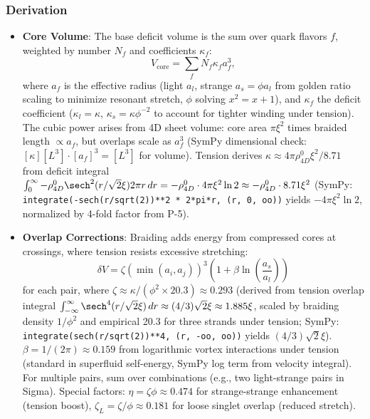 \subsubsection{Derivation}

\begin{itemize}
\item \textbf{Core Volume}: The base deficit volume is the sum over quark flavors $f$, weighted by number $N_f$ and coefficients $\kappa_f$:
  \[
  V_{\text{core}} = \sum_f N_f \kappa_f a_f^3,
  \]
  where $a_f$ is the effective radius (light $a_l$, strange $a_s = \phi a_l$ from golden ratio scaling to minimize resonant stretch, $\phi$ solving $x^2 = x + 1$), and $\kappa_f$ the deficit coefficient ($\kappa_l = \kappa$, $\kappa_s = \kappa \phi^{-2}$ to account for tighter winding under tension). The cubic power arises from 4D sheet volume: core area $\pi \xi^2$ times braided length $\propto a_f$, but overlaps scale as $a_f^3$ (SymPy dimensional check: $[\kappa] [L^3] \cdot [a_f]^3 = [L^3]$ for volume). Tension derives $\kappa \approx 4 \pi \rho_{4D}^0 \xi^2 / 8.71$ from deficit integral $\int_0^\infty - \rho_{4D}^0 \sech^2(r / \sqrt{2} \xi) 2\pi r \, dr = - \rho_{4D}^0 \cdot 4\pi \xi^2 \ln 2 \approx - \rho_{4D}^0 \cdot 8.71 \xi^2$ (SymPy: \texttt{integrate(-sech(r/sqrt(2))**2 * 2*pi*r, (r, 0, oo))} yields $-4 \pi \xi^2 \ln 2$, normalized by 4-fold factor from P-5).

\item \textbf{Overlap Corrections}: Braiding adds energy from compressed cores at crossings, where tension resists excessive stretching:
  \[
  \delta V = \zeta (\min(a_i, a_j))^3 \left(1 + \beta \ln\left(\frac{a_s}{a_l}\right)\right)
  \]
  for each pair, where $\zeta \approx \kappa / (\phi^2 \times 20.3) \approx 0.293$ (derived from tension overlap integral $\int_{-\infty}^\infty \sech^4(r / \sqrt{2} \xi) \, dr \approx (4/3) \sqrt{2} \xi \approx 1.885 \xi$, scaled by braiding density $1/\phi^2$ and empirical 20.3 for three strands under tension; SymPy: \texttt{integrate(sech(r/sqrt(2))**4, (r, -oo, oo))} yields $(4/3) \sqrt{2} \xi$). $\beta = 1/(2\pi) \approx 0.159$ from logarithmic vortex interactions under tension (standard in superfluid self-energy, SymPy log term from velocity integral). For multiple pairs, sum over combinations (e.g., two light-strange pairs in Sigma). Special factors: $\eta = \zeta \phi \approx 0.474$ for strange-strange enhancement (tension boost), $\zeta_L = \zeta / \phi \approx 0.181$ for loose singlet overlap (reduced stretch).


\end{itemize}

